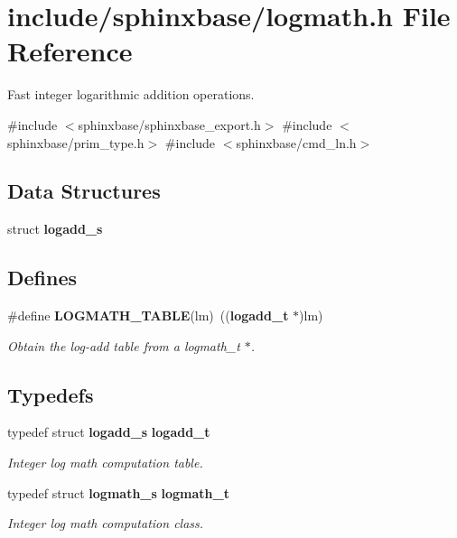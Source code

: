 \section{include/sphinxbase/logmath.h \-File \-Reference}
\label{logmath_8h}


\-Fast integer logarithmic addition operations.  


{\ttfamily \#include $<$sphinxbase/sphinxbase\-\_\-export.\-h$>$}\*
{\ttfamily \#include $<$sphinxbase/prim\-\_\-type.\-h$>$}\*
{\ttfamily \#include $<$sphinxbase/cmd\-\_\-ln.\-h$>$}\*
\subsection*{\-Data \-Structures}
\begin{DoxyCompactItemize}
\item 
struct {\bf logadd\-\_\-s}
\end{DoxyCompactItemize}
\subsection*{\-Defines}
\begin{DoxyCompactItemize}
\item 
\#define {\bf \-L\-O\-G\-M\-A\-T\-H\-\_\-\-T\-A\-B\-L\-E}(lm)~(({\bf logadd\-\_\-t} $\ast$)lm)\label{logmath_8h_ae5c5ce106e9f8f1e763d419de53317a8}

\begin{DoxyCompactList}\small\item\em \-Obtain the log-\/add table from a logmath\-\_\-t $\ast$. \end{DoxyCompactList}\end{DoxyCompactItemize}
\subsection*{\-Typedefs}
\begin{DoxyCompactItemize}
\item 
typedef struct {\bf logadd\-\_\-s} {\bf logadd\-\_\-t}
\begin{DoxyCompactList}\small\item\em \-Integer log math computation table. \end{DoxyCompactList}\item 
typedef struct {\bf logmath\-\_\-s} {\bf logmath\-\_\-t}\label{logmath_8h_ae613aa7db1dd40ff56a80a7dadb22cc8}

\begin{DoxyCompactList}\small\item\em \-Integer log math computation class. \end{DoxyCompactList}\end{DoxyCompactItemize}

